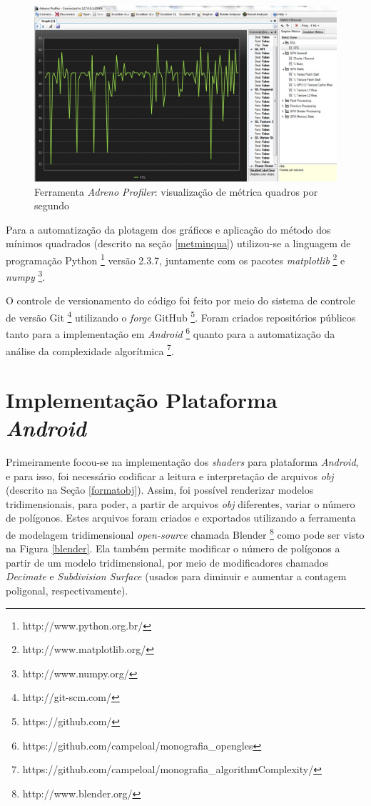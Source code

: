 	\begin{figure}[h]
	\centering
		\includegraphics[keepaspectratio=true,scale=0.35]{figuras/graph.jpg}
	\caption{Ferramenta \textit{Adreno Profiler}: visualização de métrica quadros por segundo}
	\label{graph}
	\end{figure}

	Para a automatização da plotagem dos gráficos e aplicação do método dos mínimos quadrados (descrito na seção \ref{metminqua}) utilizou-se a linguagem de programação Python \footnote{http://www.python.org.br/} versão 2.3.7, juntamente com os pacotes  \textit{matplotlib} \footnote{http://www.matplotlib.org/} e  \textit{numpy} \footnote{http://www.numpy.org/}. 

	O controle de versionamento do código foi feito por meio do sistema de controle de versão Git \footnote{http://git-scm.com/} utilizando o \textit{forge} GitHub \footnote{https://github.com/}. Foram criados repositórios públicos tanto para a implementação em \textit{Android} \footnote{https://github.com/campeloal/monografia\_opengles} quanto para a automatização da análise da complexidade algorítmica \footnote{https://github.com/campeloal/monografia\_algorithmComplexity/}. 

\section{Implementação Plataforma \textit{Android}} 

	Primeiramente focou-se na implementação dos \textit{shaders} para plataforma \textit{Android}, e para isso, foi necessário codificar a leitura e interpretação de arquivos \textit{obj} (descrito na Seção \ref{formatobj}). Assim, foi possível renderizar modelos tridimensionais, para poder, a partir de arquivos \textit{obj} diferentes, variar o número de polígonos. Estes arquivos foram criados e exportados utilizando a ferramenta de modelagem tridimensional \textit{open-source} chamada Blender \footnote{http://www.blender.org/} como pode ser visto na Figura \ref{blender}. Ela também permite modificar o número de polígonos a partir de um modelo tridimensional, por meio de modificadores chamados \textit{Decimate} e \textit{Subdivision Surface} (usados para diminuir e aumentar a contagem poligonal, respectivamente). 

